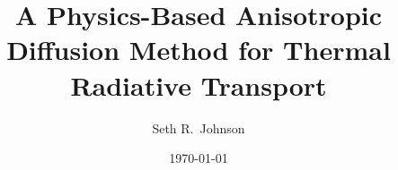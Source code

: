 \author{Seth R.~Johnson}
\title{A Physics-Based Anisotropic Diffusion Method for Thermal Radiative
Transport}
\date{\today}

\usepackage{color}

\newcommand{\chapter}[1]{%
\par\vspace{2ex}%
\noindent%
\hspace{\stretch{1}}%
\colorbox{intertextbg}{\parbox{0.75\columnwidth}{Chapter from Seth's
dissertation: \emph{#1}}}%
\hspace{\stretch{1}}%
\vspace{2ex}\par%
}

\newcommand{\prelistpar}{}
